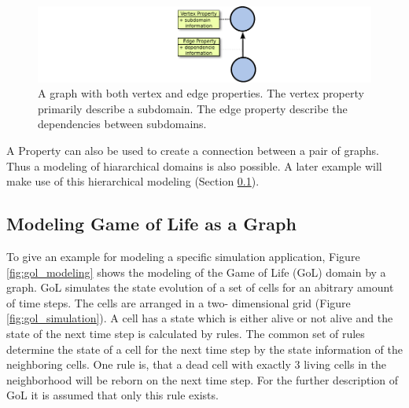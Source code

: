 \begin{figure}[H]
  \centering \includegraphics[width=\textwidth]{graphics/30_property}
  \caption{A graph with both vertex and edge properties. The vertex
    property primarily describe a subdomain. The edge property
    describe the dependencies between subdomains.}
  \label{fig:property}
\end{figure}

A Property can also be used to create a connection between a pair of
graphs. Thus a modeling of hiararchical domains is also possible.  A
later example will make use of this hierarchical modeling (Section
\ref{sec:gol}).

\subsection{Modeling Game of Life as a Graph}
\label{sec:gol}
To give an example for modeling a specific simulation application,
Figure \ref{fig:gol_modeling} shows the modeling of the Game of Life (GoL) \cite{ref:gol}
domain by a graph. GoL simulates the state evolution of a set of cells for
an abitrary amount of time steps. The cells are arranged in a two-
dimensional grid (Figure \ref{fig:gol_simulation}).  A cell has a
state which is either alive or not alive and the state of the next
time step is calculated by rules. The common set of rules determine
the state of a cell for the next time step by the state information of
the neighboring cells. One rule is, that a dead cell with
exactly 3 living cells in the neighborhood will be reborn on the next
time step. For the further description of GoL it is assumed that only
this rule exists.


